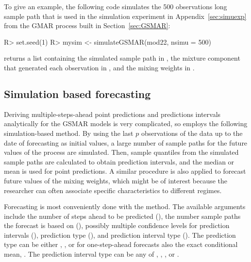 \documentclass[nojss]{jss} %
\begin{document}
To give an example, the following code simulates the 500 observations long sample path that is used in the simulation experiment in Appendix~\ref{sec:simuexp} from the GMAR process built in Section~\ref{sec:GSMAR}:
%
\begin{CodeChunk}
\begin{CodeInput}
R> set.seed(1)
R> mysim <- simulateGSMAR(mod22, nsimu = 500)
\end{CodeInput}
\end{CodeChunk}
%
 returns a list containing the simulated sample path in , the mixture component that generated each observation in , and the mixing weights in .


\subsection{Simulation based forecasting}
Deriving multiple-steps-ahead point predictions and predictions intervals analytically for the GSMAR models is very complicated, so  employs the following simulation-based method. By using the last $p$ observations of the data up to the date of forecasting as initial values, a large number of sample paths for the future values of the process are simulated. Then, sample quantiles from the simulated sample paths are calculated to obtain prediction intervals, and the median or mean is used for point predictions. A similar procedure is also applied to forecast future values of the mixing weights, which might be of interest because the researcher can often associate specific characteristics to different regimes.

Forecasting is most conveniently done with the  method. The available arguments include the number of steps ahead to be predicted (), the number sample paths the forecast is based on (), possibly multiple confidence levels for prediction intervals (), prediction type (), and prediction interval type (). The prediction type can be either , , or for one-step-ahead forecasts also the exact conditional mean, . The prediction interval type can be any of , , , or .
\end{document}
